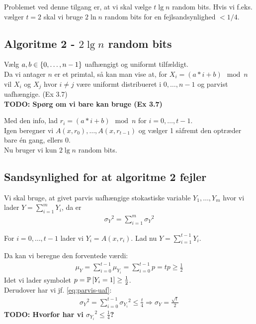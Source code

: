Problemet ved denne tilgang er, at vi skal vælge $t \lg n$ random bits. Hvis vi f.eks. vælger $t = 2$ skal vi bruge $2 \ln n$ random bits for en fejlsandsynlighed $< 1/4$.

\subsection{Algoritme 2 - $2 \lg n$ random bits}
Vælg $a, b \in \curly{0, \dots, n-1}$ uafhængigt og uniformt tilfældigt.\\

Da vi antager $n$ er et primtal, så kan man vise at, for $X_i = (a * i + b) \mod n$ vil $X_i$ og $X_j$ hvor $i \neq j$ være uniformt distribueret i $0, \dots, n-1$ og parvist uafhængige. (Ex 3.7)\\
\textbf{TODO: Spørg om vi bare kan bruge (Ex 3.7)}

Med den info, lad $r_i = (a * i + b) \mod n$ for $i = 0, \dots, t-1$.\\
Igen beregner vi $A(x, r_0), \dots, A(x, r_{t-1})$ og vælger 1 såfremt den optræder bare én gang, ellers 0.\\

Nu bruger vi kun $2 \lg n$ random bits.

\subsection{Sandsynlighed for at algoritme 2 fejler}
Vi skal bruge, at givet parvis uafhængige stokastiske variable $Y_1, \dots, Y_m$ hvor vi lader $Y = \sum_{i=1}^m Y_i$, da er
\begin{align}
  {\sigma_Y}^2 = \sum_{i=1}^m {\sigma_Y}^2 \label{eq:parvis-uaf}
\end{align}\vspace{2em}

For $i = 0, \dots, t-1$ lader vi $Y_i = A(x, r_i)$. Lad nu $Y = \sum_{i=1}^{t-1} Y_i$.

Da kan vi beregne den forventede værdi:
\begin{align}
  \mu_Y = \sum_{i=0}^{t-1} \mu_{Y_i} = \sum_{i=0}^{t-1} p = tp \geq \frac{1}{2} \label{eq:mu-y-ulighed}
\end{align}
Idet vi lader symbolet $p = \P{Y_i = 1} \geq \frac{1}{2}$.\\

Derudover har vi jf. \cref{eq:parvis-uaf}:
\begin{align*}
  {\sigma_Y}^2 = \sum_{i=0}^{t-1} {\sigma_{Y_i}}^2 \leq \frac{t}{4} \Longrightarrow \sigma_Y = \frac{\sqrt{t}}{2}
\end{align*}
\textbf{TODO: Hvorfor har vi ${\sigma_{Y_i}}^2 \leq \frac{1}{4}$?}\\

